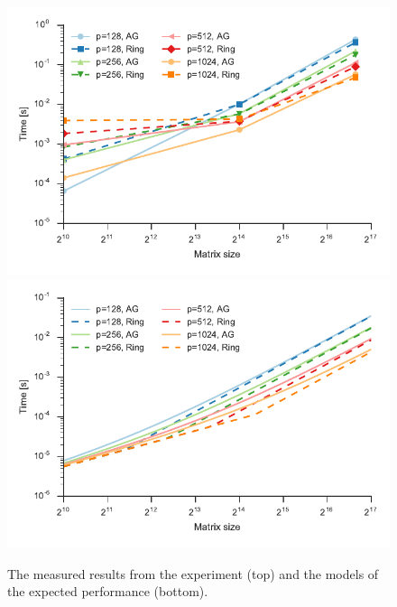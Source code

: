 \documentclass{article}
\begin{document}
    \begin{figure}
        \centering
        \includegraphics{data.pdf}\\
        \includegraphics{model.pdf}
        \caption{The measured results from the experiment (top) and the models of the expected performance (bottom).}
        \label{fig:results}
    \end{figure}
\end{document}
